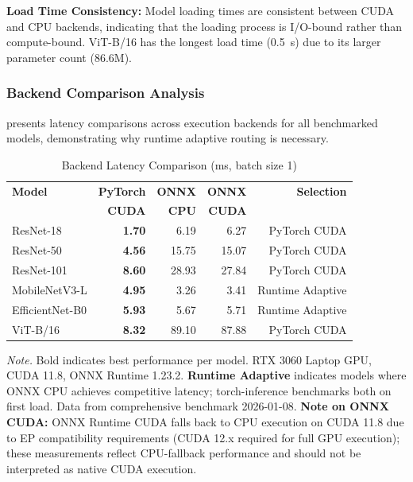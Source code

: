 \documentclass[10pt,twocolumn,a4paper]{article}
\theoremstyle{definition}
\theoremstyle{plain}
\begin{document}
\textbf{Load Time Consistency:} Model loading times are consistent between CUDA and CPU backends, indicating that the loading process is I/O-bound rather than compute-bound. ViT-B/16 has the longest load time (\SI{0.5}{\second}) due to its larger parameter count (86.6M).

\subsubsection{Backend Comparison Analysis}

 presents latency comparisons across execution backends for all benchmarked models, demonstrating why runtime adaptive routing is necessary.

\begin{table}[t]
\centering
\caption{Backend Latency Comparison (ms, batch size 1)}
\label{tab:backend_comparison}
\scriptsize
\setlength{\tabcolsep}{3pt}
\begin{tabular}{@{}lrrrr@{}}
\toprule
\textbf{Model} & \textbf{PyTorch} & \textbf{ONNX} & \textbf{ONNX} & \textbf{Selection} \\
 & \textbf{CUDA} & \textbf{CPU} & \textbf{CUDA} & \\
\midrule
ResNet-18 & \textbf{1.70} & 6.19 & 6.27 & PyTorch CUDA \\
ResNet-50 & \textbf{4.56} & 15.75 & 15.07 & PyTorch CUDA \\
ResNet-101 & \textbf{8.60} & 28.93 & 27.84 & PyTorch CUDA \\
MobileNetV3-L & \textbf{4.95} & 3.26 & 3.41 & Runtime Adaptive \\
EfficientNet-B0 & \textbf{5.93} & 5.67 & 5.71 & Runtime Adaptive \\
ViT-B/16 & \textbf{8.32} & 89.10 & 87.88 & PyTorch CUDA \\
\bottomrule
\end{tabular}

\vspace{0.5em}
\noindent\textit{Note.} Bold indicates best performance per model. RTX 3060 Laptop GPU, CUDA 11.8, ONNX Runtime 1.23.2. \textbf{Runtime Adaptive} indicates models where ONNX CPU achieves competitive latency; torch-inference benchmarks both on first load. Data from comprehensive benchmark 2026-01-08. \textbf{Note on ONNX CUDA:} ONNX Runtime CUDA falls back to CPU execution on CUDA 11.8 due to EP compatibility requirements (CUDA 12.x required for full GPU execution); these measurements reflect CPU-fallback performance and should not be interpreted as native CUDA execution.
\end{table}
\end{document}
